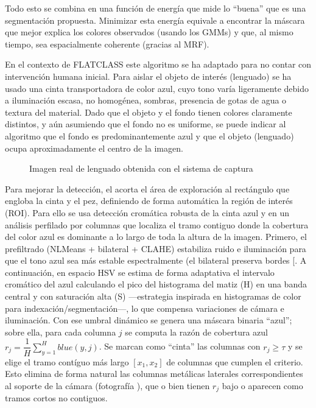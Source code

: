 \documentclass[a4paper,10pt,spanish]{jupyterBook}
\begin{document}
\sphinxAtStartPar
Todo esto se combina en una función de energía que mide lo “buena” que es una segmentación propuesta. Minimizar esta energía equivale a encontrar la máscara que mejor explica los colores observados (usando los GMMs) y que, al mismo tiempo, sea espacialmente coherente (gracias al MRF).

\sphinxAtStartPar
En el contexto de FLATCLASS este algoritmo se ha adaptado para no contar con intervención humana inicial. Para aislar el objeto de interés (lenguado) se ha usado una cinta transportadora de color azul, cuyo tono varía ligeramente debido a iluminación escasa, no homogénea, sombras, presencia de gotas de agua o textura del material. Dado que el objeto y el fondo tienen colores claramente distintos, y aún asumiendo que el fondo no es uniforme, se puede indicar al algoritmo que el fondo es predominantemente azul y que el objeto (lenguado) ocupa aproximadamente el centro de la imagen.

\begin{figure}[htbp]
\centering
\capstart

\noindent{}
\caption{Imagen real de lenguado obtenida con el sistema de captura}\label{\detokenize{content/01/Modulo-3:figura-wp1-imagen-7}}\end{figure}

\sphinxAtStartPar
Para mejorar la detección, el  acorta el área de exploración al rectángulo que engloba la cinta y el pez, definiendo de forma automática la región de interés (ROI). Para ello se usa detección cromática robusta de la cinta azul y en un análisis perfilado por columnas que localiza el tramo contiguo donde la cobertura del color azul es dominante a lo largo de toda la altura de la imagen. Primero, el prefiltrado (NLMeans + bilateral + CLAHE) estabiliza ruido e iluminación para que el tono azul sea más estable espectralmente (el bilateral preserva bordes {[}\sphinxhref{https://www.academia.edu/103435418/Bilateral\_filtering\_for\_gray\_and\_color\_images}{Tomasi et al., 1998}{]}. A continuación, en espacio HSV se estima de forma adaptativa el intervalo cromático del azul calculando el pico del histograma del matiz (H) en una banda central y con saturación alta (S) —estrategia inspirada en histogramas de color para indexación/segmentación—, lo que compensa variaciones de cámara e iluminación. Con ese umbral dinámico se genera una máscara binaria “azul”; sobre ella, para cada columna \(j\) se computa la razón de cobertura azul \(r_j=\dfrac{1}{H} \sum^H_{y=1} {blue(y,j)}\). Se marcan como “cinta” las columnas con \(r_j \geq \tau\) y se elige el tramo contíguo más largo \([x_1,x_2]\) de columnas que cumplen el criterio. Esto elimina de forma natural las columnas metálicas laterales correspondientes al soporte de la cámara (fotografía ), que o bien tienen \(r_j\) bajo o aparecen como tramos cortos no contiguos.
\end{document}
